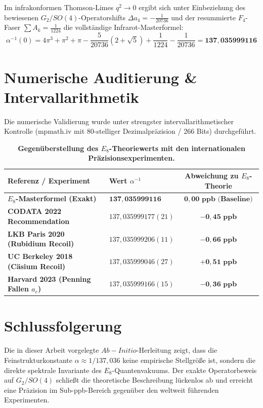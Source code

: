 \documentclass[11pt,a4paper]{article}
\begin{document}
	Im infrakonformen Thomson-Limes $q^2 \to 0$ ergibt sich unter Einbeziehung des bewiesenen $G_2/SO(4)$-Operatorshifts $\Delta a_4 = -\frac{1}{20736}$ und der resummierte $F_4$-Faser $\sum A_k = \frac{1}{1224}$ die vollständige Infrarot-Masterformel:
	\begin{equation}
		\alpha^{-1}(0) = 4\pi^3 + \pi^2 + \pi - \frac{5}{20736}(2+\sqrt{5}) + \frac{1}{1224} - \frac{1}{20736} = \mathbf{137{,}035999116}
	\end{equation}
	
	\section{Numerische Auditierung \& Intervallarithmetik}
	
	Die numerische Validierung wurde unter strengster intervallarithmetischer Kontrolle ($\text{mpmath.iv}$ mit 80-stelliger Dezimalpräzision / 266 Bits) durchgeführt.
	
	\begin{table}[h]
		\centering
		\caption{\textbf{Gegenüberstellung des $E_8$-Theoriewerts mit den internationalen Präzisionsexperimenten.}}
		\vspace{1ex}
		\begin{tabular}{llc}
			\toprule
			\textbf{Referenz / Experiment} & \textbf{Wert $\alpha^{-1}$} & \textbf{Abweichung zu $E_8$-Theorie} \\
			\midrule
			\textbf{$E_8$-Masterformel (Exakt)} & $\mathbf{137{,}035999116}$ & $\mathbf{0{,}00\text{ ppb (Baseline)}}$ \\
			\textbf{CODATA 2022 Recommendation} & $137{,}035999177(21)$ & $-\mathbf{0{,}45\text{ ppb}}$ \\
			\textbf{LKB Paris 2020 (Rubidium Recoil)} & $137{,}035999206(11)$ & $-\mathbf{0{,}66\text{ ppb}}$ \\
			\textbf{UC Berkeley 2018 (Cäsium Recoil)} & $137{,}035999046(27)$ & $+\mathbf{0{,}51\text{ ppb}}$ \\
			\textbf{Harvard 2023 (Penning Fallen $a_e$)} & $137{,}035999166(15)$ & $-\mathbf{0{,}36\text{ ppb}}$ \\
			\bottomrule
		\end{tabular}
	\end{table}
	

	
	\section{Schlussfolgerung}
	
	Die in dieser Arbeit vorgelegte $Ab-Initio$-Herleitung zeigt, dass die Feinstrukturkonstante $\alpha \approx 1/137{,}036$ keine empirische Stellgröße ist, sondern die direkte spektrale Invariante des $E_8$-Quantenvakuums. Der exakte Operatorbeweis auf $G_2/SO(4)$ schließt die theoretische Beschreibung lückenlos ab und erreicht eine Präzision im Sub-ppb-Bereich gegenüber den weltweit führenden Experimenten.
	
\end{document}
